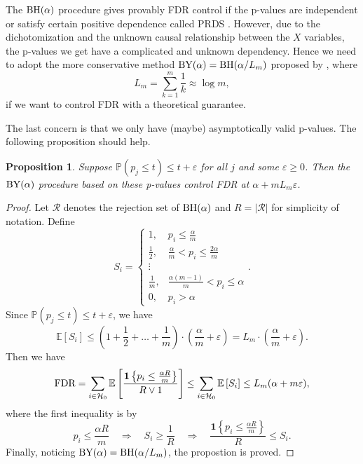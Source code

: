 \documentclass[11pt]{article}
\newtheorem{prop}{Proposition}[section]
\newcommand{\cH}{\mathcal{H}}
\newcommand{\cR}{\mathcal{R}}
\newcommand{\PP}{\mathbb{P}}
\newcommand{\one}{\mathbf{1}}
\newcommand{\ep}{\varepsilon}
\newcommand{\FDR}{\textnormal{FDR}}
\newcommand{\BH}{{\textnormal{BH}}}
\newcommand{\BY}{{\textnormal{BY}}}
\newcommand{\pth}[1]{\left( #1 \right)}
\newcommand{\br}[1]{\left[ #1 \right]}
\newcommand{\mam}{\vee}
\begin{document}
The $\BH(\alpha)$ procedure gives provably FDR control if the p-values are independent or satisfy certain positive dependence called PRDS \citep{benjamini2001control}. However, due to the dichotomization and the unknown causal relationship between the $X$ variables, the p-values we get have a complicated and unknown dependency. Hence we need to adopt the more conservative method $\BY(\alpha) = \BH(\alpha / L_m)$ proposed by \citet{benjamini2001control}, where
\[ L_m = \sum_{k=1}^m \frac 1k \approx \log m, \]
if we want to control FDR with a theoretical guarantee.

The last concern is that we only have (maybe) asymptotically valid p-values. The following proposition should help.

\begin{prop} \label{prop:asymp}
    Suppose $\PP(p_j \leq t) \leq t + \ep$ for all $j$ and some $\ep \geq 0$. Then the $\BY(\alpha)$ procedure based on these p-values control FDR at $\alpha + m L_m \ep$.
\end{prop}
\begin{proof}
    Let $\cR$ denotes the rejection set of $\BH(\alpha)$ and $R = |\cR|$ for simplicity of notation. Define
    \[
        S_i=\left\{\begin{array}{cl}
1, & p_{i} \leq \frac{\alpha}{m} \\
\frac{1}{2}, & \frac{\alpha}{m}<p_{i} \leq \frac{2 \alpha}{m} \\
\vdots & \\
\frac{1}{m}, & \frac{\alpha(m-1)}{m}<p_{i} \leq \alpha \\
0, & p_{i}>\alpha
\end{array}\right..
    \]
    Since $\PP(p_j \leq t) \leq t + \ep$, we have
    \[ 
        \mathbb{E}\left[S_{i}\right] \leq\left(1+\frac{1}{2}+\ldots+\frac{1}{m}\right) \cdot \pth{\frac{\alpha}{m} + \ep} = L_m \cdot \pth{\frac{\alpha}{m} + \ep}.
    \]
    Then we have
    \begin{align*}
        \FDR = \sum_{i \in \cH_{0}} \mathbb{E} \left[\frac{\one \left\{p_{i} \leq \frac{\alpha R}{m}\right\}}{R \mam 1}\right]
        \leq \sum_{i \in \cH_{0}} \mathbb{E} \br{S_i}
        \leq L_m (\alpha + m \ep),
    \end{align*}
    where the first inequality is by 
    \[
        p_{i} \leq \frac{\alpha R}{m} \quad\Rightarrow\quad S_{i} \geq \frac{1}{R} \quad\Rightarrow\quad \frac{\one \left\{p_{i} \leq \frac{\alpha R}{m}\right\}}{R} \leq S_{i}.
    \]
    Finally, noticing $\BY(\alpha) = \BH(\alpha / L_m)$, the propostion is proved.
\end{proof}
\end{document}
